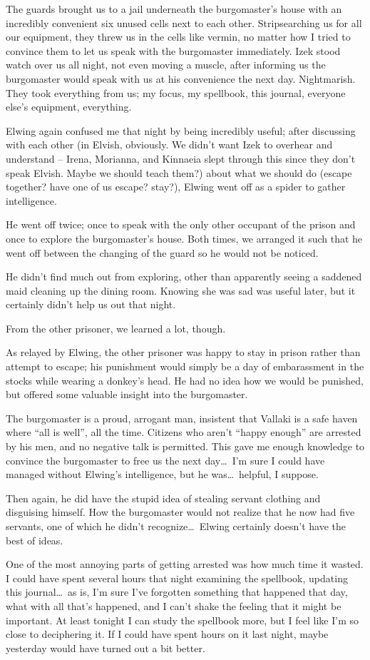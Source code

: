 The guards brought us to a jail underneath the burgomaster's house with an incredibly convenient six unused cells next to each other. Stripsearching us for all our equipment, they threw us in the cells like vermin, no matter how I tried to convince them to let us speak with the burgomaster immediately. Izek stood watch over us all night, not even moving a muscle, after informing us the burgomaster would speak with us at his convenience the next day. Nightmarish. They took everything from us; my focus, my spellbook, this journal, everyone else's equipment, everything.

Elwing again confused me that night by being incredibly useful; after discussing with each other (in Elvish, obviously. We didn't want Izek to overhear and understand -- Irena, Morianna, and Kinnaeia slept through this since they don't speak Elvish. Maybe we should teach them?) about what we should do (escape together? have one of us escape? stay?), Elwing went off as a spider to gather intelligence.

He went off twice; once to speak with the only other occupant of the prison and once to explore the burgomaster's house. Both times, we arranged it such that he went off between the changing of the guard so he would not be noticed.

He didn't find much out from exploring, other than apparently seeing a saddened maid cleaning up the dining room. Knowing she was sad was useful later, but it certainly didn't help us out that night.

From the other prisoner, we learned a lot, though.

As relayed by Elwing, the other prisoner was happy to stay in prison rather than attempt to escape; his punishment would simply be a day of embarassment in the stocks while wearing a donkey's head. He had no idea how we would be punished, but offered some valuable insight into the burgomaster.

The burgomaster is a proud, arrogant man, insistent that Vallaki is a safe haven where ``all is well'', all the time. Citizens who aren't ``happy enough'' are arrested by his men, and no negative talk is permitted. This gave me enough knowledge to convince the burgomaster to free us the next day\dots\ I'm sure I could have managed without Elwing's intelligence, but he was\dots\ helpful, I suppose.

Then again, he did have the stupid idea of stealing servant clothing and disguising himself. How the burgomaster would not realize that he now had five servants, one of which he didn't recognize\dots\ Elwing certainly doesn't have the best of ideas.

One of the most annoying parts of getting arrested was how much time it wasted. I could have spent several hours that night examining the spellbook, updating this journal\dots\ as is, I'm sure I've forgotten something that happened that day, what with all that's happened, and I can't shake the feeling that it might be important. At least tonight I can study the spellbook more, but I feel like I'm so close to deciphering it. If I could have spent hours on it last night, maybe yesterday would have turned out a bit better.

\sleep
